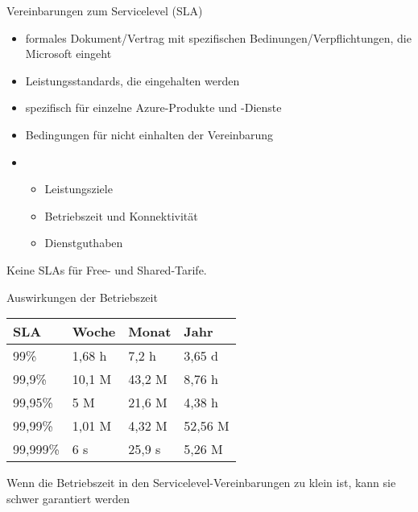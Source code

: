 
\begin{flashcard}[Definition]{Vereinbarungen zum Servicelevel (SLA)}
    \begin{itemize}
        \item formales Dokument/Vertrag mit spezifischen Bedinungen/Verpflichtungen, die Microsoft eingeht
        \item Leistungsstandards, die eingehalten werden
        \item spezifisch für einzelne Azure-Produkte und -Dienste
        \item Bedingungen für nicht einhalten der Vereinbarung
        \item
            \begin{itemize}
                \item Leistungsziele
                \item Betriebszeit und Konnektivität
                \item Dienstguthaben
            \end{itemize}

    \end{itemize}
    Keine SLAs für Free- und Shared-Tarife.
\end{flashcard}

\begin{flashcard}[\ ]{Auswirkungen der Betriebszeit}
    \begin{tabular}{l|lll}
        SLA      &  Woche  & Monat  & Jahr    \\
        \hline
        99\%     &  1,68 h & 7,2 h  & 3,65 d  \\
        99,9\%   &  10,1 M & 43,2 M & 8,76 h  \\
        99,95\%  &  5 M    & 21,6 M & 4,38 h  \\
        99,99\%  &  1,01 M & 4,32 M & 52,56 M \\
        99,999\% &  6 s    & 25,9 s & 5,26 M  \\
    \end{tabular}

    \vspace{5mm}
    Wenn die Betriebszeit in den Servicelevel-Vereinbarungen zu klein ist, kann sie schwer garantiert werden
\end{flashcard}

